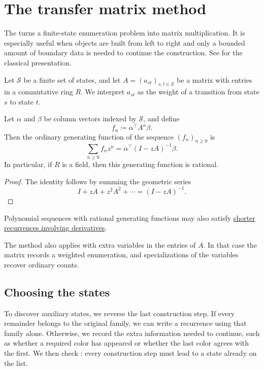 


\section[transferMatrixMethod]{The transfer matrix method}

The  turns a finite-state enumeration problem
into matrix multiplication.  It is especially useful when objects are built
from left to right and only a bounded amount of boundary data is needed to
continue the construction.  See \cite[Sec.~4.7]{StanleyEC1} for the classical
presentation.

Let $\mathcal{S}$ be a finite set of states, and let $A=(a_{st})_{s,t\in\mathcal{S}}$
be a matrix with entries in a commutative ring $R$.  We interpret $a_{st}$ as
the weight of a transition from state $s$ to state $t$.

\begin{proposition}
Let $\alpha$ and $\beta$ be column vectors indexed by $\mathcal{S}$, and define
\[
  f_n \coloneqq \alpha^\top A^n \beta .
\]
Then the ordinary generating function of the sequence $(f_n)_{n\geq 0}$ is
\[
  \sum_{n\geq 0} f_n z^n
  =
  \alpha^\top (I-zA)^{-1}\beta .
\]
In particular, if $R$ is a field, then this generating function is rational.
\end{proposition}

\begin{proof}
The identity follows by summing the geometric series
\[
  I+zA+z^2A^2+\dotsb=(I-zA)^{-1}.
\]
\end{proof}

Polynomial sequences with rational generating functions may also satisfy
\hyperref[polynomialRecurrences]{shorter recurrences involving derivatives}.

The method also applies with extra variables in the entries of $A$.  In that
case the matrix records a weighted enumeration, and specializations of the
variables recover ordinary counts.


\subsection[transferMatrixChoosingStates]{Choosing the states}

To discover auxiliary states, we reverse the last construction step.
If every remainder belongs to the original family, we can write a recurrence
using that family alone. Otherwise, we record the extra information needed
to continue, such as whether a required color has appeared or whether the
last color agrees with the first. We then check : every
construction step must lead to a state already on the list.

